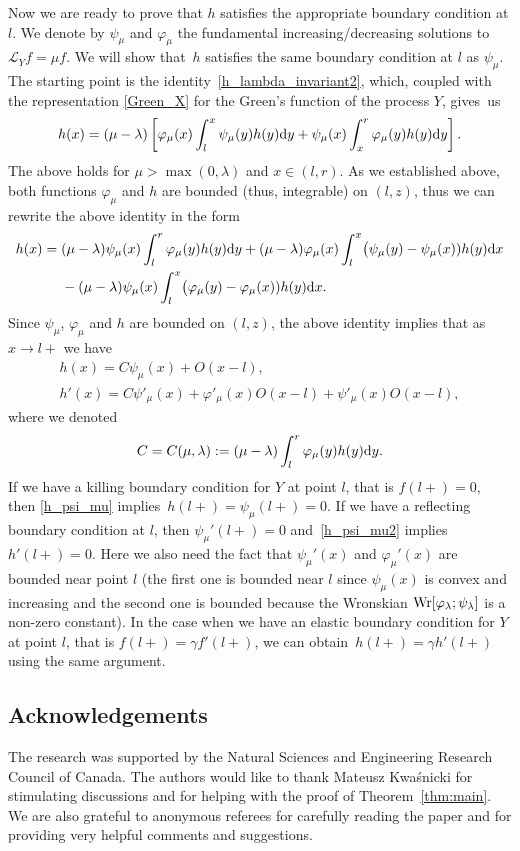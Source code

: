 \documentclass[10pt,a4paper]{amsart}
\numberwithin{equation}{section}
\theoremstyle{definition}
\def\L{{\mathcal L}}
\def\wr{{\textnormal{Wr}}}
\def\d{{\textnormal d}}
\begin{document}
Now we are ready to prove that $h$ satisfies the appropriate boundary condition at $l$. We denote by $\psi_{\mu}$ and $\varphi_{\mu}$ the fundamental increasing/decreasing solutions to $\L_Y f = \mu f$. We will show that~$h$ satisfies the same boundary condition at $l$ as $\psi_{\mu}$.
The starting point is the identity~\eqref{h_lambda_invariant2}, which, coupled with the representation \eqref{Green_X} for the Green's function of the process $Y$, gives~us
\[
h(x)=(\mu-\lambda) \left[ \varphi_{\mu}(x) \int_l^x \psi_{\mu}(y) h(y) \d y+ \psi_{\mu}(x) \int_x^r \varphi_{\mu}(y) h(y) \d y \right].
\]
The above holds for $\mu > \max(0,\lambda)$ and $x\in (l,r)$. As we established above, both functions $\varphi_{\mu}$ and $h$ are bounded (thus, integrable) on $(l,z)$, thus we can rewrite the above identity in the form
\begin{align*}
h(x)={}&(\mu-\lambda) \psi_{\mu}(x) \int_l^r \varphi_{\mu}(y) h(y) \d y+ (\mu-\lambda) \varphi_{\mu}(x) \int_l^x \bigl(\psi_{\mu}(y)- \psi_{\mu}(x)) h(y) \d x \\
&- (\mu-\lambda)
\psi_{\mu}(x) \int_l^x \bigl(\varphi_{\mu}(y)- \varphi_{\mu}(x)) h(y) \d x.
\end{align*}
Since $\psi_{\mu}$, $\varphi_{\mu}$ and $h$ are bounded on $(l,z)$, the above identity implies that as $x\to l+$ we have
\begin{gather}
h(x)=C \psi_{\mu}(x) + O(x-l), \label{h_psi_mu}\\
h'(x)=C \psi'_{\mu}(x) + \varphi'_{\mu}(x) O(x-l)+
\psi'_{\mu}(x) O(x-l),\label{h_psi_mu2}
\end{gather}
where we denoted
\[
C=C(\mu,\lambda):=(\mu-\lambda) \int_l^r \varphi_{\mu}(y) h(y) \d y.
\]
If we have a killing boundary condition for $Y$ at point $l$, that is $f(l+)=0$, then \eqref{h_psi_mu} implies~${h(l+)=\psi_{\mu}(l+)=0}$. If we have a reflecting boundary condition at $l$, then $\psi_{\mu}'(l+)=0$ and~\eqref{h_psi_mu2} implies $h'(l+)=0$. Here we also need the fact that $\psi_{\mu}'(x)$ and $\varphi_{\mu}'(x)$ are bounded near point $l$ (the first one is bounded near $l$ since $\psi_{\mu}(x)$ is convex and increasing and the second one is bounded because the Wronskian
$\wr[\varphi_{\lambda}; \psi_{\lambda}]$ is a non-zero constant).
In the case when we have an elastic boundary condition for $Y$ at point $l$, that is $f(l+)=\gamma f'(l+)$, we can obtain~${h(l+)=\gamma h'(l+)}$ using the same argument.


\subsection*{Acknowledgements} The research was supported by the Natural Sciences and Engineering Research Council of
Canada. The authors would like to thank Mateusz Kwa\'snicki for stimulating discussions and for helping with the proof of Theorem~\ref{thm:main}. We are also grateful to anonymous referees for carefully reading the paper and for providing very helpful comments and suggestions.
\end{document}
